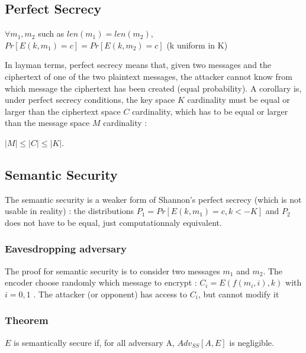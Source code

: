 \subsection{Perfect Secrecy}

\begin{mytheorem}
    $\forall m_1,m_2$ such as $len(m_1) = len(m_2)$, 
    $Pr[E(k,m_1) = c] = Pr[E(k,m_2) = c]$  \flushright (k uniform in K)
\end{mytheorem}

In layman terms, perfect secrecy means that, given two messages and the ciphertext of one of the two plaintext messages, the attacker cannot know from which message the ciphertext has been created (equal probability). A corollary is, under perfect secrecy conditions, the key space $K$ cardinality must be equal or larger than the ciphertext space $C$ cardinality, which has to be equal or larger than the message space $M$ cardinality :
\begin{mytheorem}
    $ |M| \leq |C| \leq |K| $. 
\end{mytheorem}


\subsection{Semantic Security}

The semantic security is a weaker form of Shannon's perfect secrecy (which is not usable in reality) : the distributions $P_1 = Pr[E(k,m_1) = c , k<- K]$ and $P_2$ does not have to be equal, just computationnaly equivalent.


\subsubsection{Eavesdropping adversary}
    The proof for semantic security is to consider two messages $m_1$ and $m_2$. The encoder choose randomly which message to encrypt : $C_i = E( f(m_i,i), k)$ with $i = {0,1}$ .
The attacker (or opponent) has access to $C_i$, but cannot modify it 

\subsubsection{Theorem}

\begin{mytheorem}
    $E$ is semantically secure if, for all adversary A, $Adv_{SS}[A,E]$ is negligible.
\end{mytheorem}

